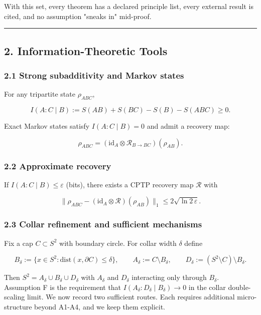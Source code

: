 With this set, every theorem has a declared principle list, every external result is cited, and no assumption "sneaks in" mid-proof.

\begin{center}\rule{0.5\linewidth}{0.5pt}\end{center}

\subsection{2. Information-Theoretic Tools}\label{2-information-theoretic-tools}

\subsubsection{2.1 Strong subadditivity and Markov states}\label{21-strong-subadditivity-and-markov-states}

For any tripartite state \(\rho_{ABC}\),

\[
I(A:C \mid B) := S(AB) + S(BC) - S(B) - S(ABC) \ge 0.
\]

Exact Markov states satisfy \(I(A:C \mid B) = 0\) and admit a recovery map:

\[
\rho_{ABC} = (\mathrm{id}_A \otimes \mathcal R_{B\to BC})(\rho_{AB}).
\]

\subsubsection{2.2 Approximate recovery}\label{22-approximate-recovery}

If \(I(A:C \mid B) \le \varepsilon\) (bits), there exists a CPTP recovery map \(\mathcal{R}\) with

\[
\| \rho_{ABC} - (\mathrm{id}_A \otimes \mathcal R)(\rho_{AB}) \|_1
\le 2 \sqrt{\ln 2\, \varepsilon}.
\]

\subsubsection{2.3 Collar refinement and sufficient mechanisms}\label{23-collar-refinement-and-sufficient-mechanisms}

Fix a cap \(C \subset S^2\) with boundary circle. For collar width \(\delta\) define

\[
B_\delta := \{x \in S^2 : \mathrm{dist}(x,\partial C) \le \delta\},
\qquad
A_\delta := C \setminus B_\delta,
\qquad
D_\delta := (S^2 \setminus C) \setminus B_\delta.
\]

Then \(S^2 = A_\delta \cup B_\delta \cup D_\delta\) with \(A_\delta\) and \(D_\delta\) interacting only through \(B_\delta\). Assumption F is the requirement that \(I(A_\delta:D_\delta \mid B_\delta) \to 0\) in the collar double-scaling limit. We now record two sufficient routes. Each requires additional micro-structure beyond A1-A4, and we keep them explicit.


